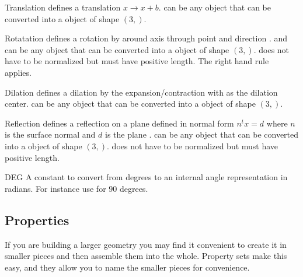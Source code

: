 \begin{classdesc}{Translation}{}
defines a translation $x \to x+b$.  can be any object that can be converted 
into a \numpy object of shape $(3,)$.
\end{classdesc}
              
\begin{classdesc}{Rotatation}{ }
defines a rotation by  around axis through point  and direction . 
 and  can be any object that can be converted 
into a \numpy object of shape $(3,)$.
 does not have to be normalized but must have positive length. The right hand rule~\cite{RIGHTHANDRULE}
applies.
\end{classdesc}


\begin{classdesc}{Dilation}{}
defines a dilation by the expansion/contraction  with 
 as the dilation center.
 can be any object that can be converted 
into a \numpy object of shape $(3,)$.
\end{classdesc}

\begin{classdesc}{Reflection}{}
defines a reflection on a plane defined in normal form $n^t x = d$ 
where $n$ is the surface normal  and $d$ is the plane .
 can be any object that can be converted 
into a \numpy object of shape $(3,)$.
 does not have to be normalized but must have positive length. 
\end{classdesc}

\begin{datadesc}{DEG}
A constant to convert from degrees to an internal angle representation in radians. For instance use  for $90$ degrees.
\end{datadesc}

\subsection{Properties}

If you are building a larger geometry you may find it convenient to
create it in smaller pieces and then assemble them into the whole. 
Property sets make this easy, and they allow you to name the smaller
pieces for convenience.

